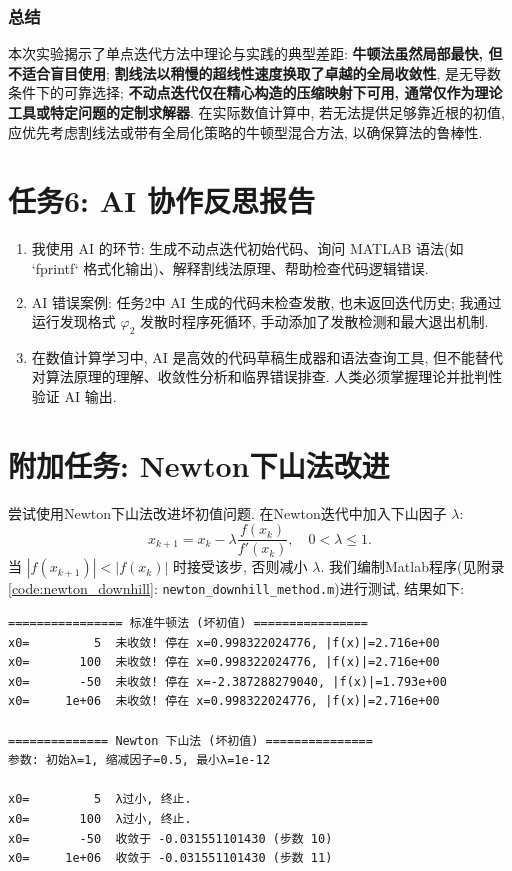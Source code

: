 \documentclass[12pt,a4paper]{ctexart}
\begin{document}
\subsubsection*{总结}

本次实验揭示了单点迭代方法中理论与实践的典型差距: \textbf{牛顿法虽然局部最快, 但不适合盲目使用}; \textbf{割线法以稍慢的超线性速度换取了卓越的全局收敛性}, 是无导数条件下的可靠选择; \textbf{不动点迭代仅在精心构造的压缩映射下可用, 通常仅作为理论工具或特定问题的定制求解器}. 在实际数值计算中, 若无法提供足够靠近根的初值, 应优先考虑割线法或带有全局化策略的牛顿型混合方法, 以确保算法的鲁棒性. 

\section{任务6: AI 协作反思报告}
\begin{enumerate}
    \item 我使用 AI 的环节: 生成不动点迭代初始代码、询问 MATLAB 语法(如 `fprintf` 格式化输出)、解释割线法原理、帮助检查代码逻辑错误. 
    \item AI 错误案例: 任务2中 AI 生成的代码未检查发散, 也未返回迭代历史; 我通过运行发现格式 $\varphi_2$ 发散时程序死循环, 手动添加了发散检测和最大退出机制. 
    \item 在数值计算学习中, AI 是高效的代码草稿生成器和语法查询工具, 但不能替代对算法原理的理解、收敛性分析和临界错误排查. 人类必须掌握理论并批判性验证 AI 输出. 
\end{enumerate}

\section{附加任务: Newton下山法改进}
尝试使用Newton下山法改进坏初值问题. 在Newton迭代中加入下山因子 $\lambda$: 
\[
x_{k+1} = x_k - \lambda \frac{f(x_k)}{f'(x_k)},\quad 0<\lambda\le 1.
\]
当 $|f(x_{k+1})| < |f(x_k)|$ 时接受该步, 否则减小 $\lambda$. 我们编制Matlab程序(见附录\ref{code:newton_downhill}: \texttt{newton\_downhill\_method.m})进行测试, 结果如下:
\begin{lstlisting}
================ 标准牛顿法 (坏初值) ================
x0=         5  未收敛! 停在 x=0.998322024776, |f(x)|=2.716e+00
x0=       100  未收敛! 停在 x=0.998322024776, |f(x)|=2.716e+00
x0=       -50  未收敛! 停在 x=-2.387288279040, |f(x)|=1.793e+00
x0=     1e+06  未收敛! 停在 x=0.998322024776, |f(x)|=2.716e+00

============== Newton 下山法 (坏初值) ===============
参数: 初始λ=1, 缩减因子=0.5, 最小λ=1e-12

x0=         5  λ过小, 终止.
x0=       100  λ过小, 终止.
x0=       -50  收敛于 -0.031551101430 (步数 10)
x0=     1e+06  收敛于 -0.031551101430 (步数 11)
\end{lstlisting}
\end{document}
